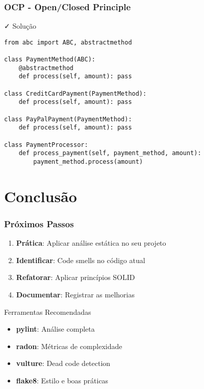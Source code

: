 \documentclass[aspectratio=169]{beamer}
\begin{document}
\begin{frame}[fragile]
\frametitle{OCP - Open/Closed Principle}
\begin{block}{\textcolor{cleangreen}{\faCheck} Solução}
\scriptsize
\begin{lstlisting}
from abc import ABC, abstractmethod

class PaymentMethod(ABC):
    @abstractmethod
    def process(self, amount): pass

class CreditCardPayment(PaymentMethod):
    def process(self, amount): pass

class PayPalPayment(PaymentMethod):
    def process(self, amount): pass

class PaymentProcessor:
    def process_payment(self, payment_method, amount):
        payment_method.process(amount)
\end{lstlisting}
\end{block}
\end{frame}

\section{Conclusão}

\begin{frame}
\frametitle{Próximos Passos}
\begin{enumerate}
    \item \textbf{Prática}: Aplicar análise estática no seu projeto
    \item \textbf{Identificar}: Code smells no código atual
    \item \textbf{Refatorar}: Aplicar princípios SOLID
    \item \textbf{Documentar}: Registrar as melhorias
\end{enumerate}

\vspace{0.5cm}
\begin{block}{Ferramentas Recomendadas}
\footnotesize
\begin{itemize}
    \item \textbf{pylint}: Análise completa
    \item \textbf{radon}: Métricas de complexidade
    \item \textbf{vulture}: Dead code detection
    \item \textbf{flake8}: Estilo e boas práticas
\end{itemize}
\end{block}
\end{frame}
\end{document}
